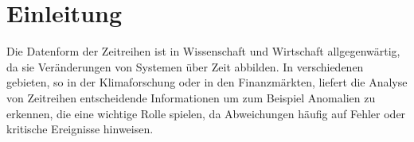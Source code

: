 \chapter{Einleitung}\label{ch:einleitung}
Die Datenform der Zeitreihen ist in Wissenschaft und Wirtschaft allgegenwärtig, da sie Veränderungen von Systemen über Zeit abbilden. In verschiedenen gebieten, so in der Klimaforschung oder in den Finanzmärkten, liefert die Analyse von Zeitreihen entscheidende Informationen um zum Beispiel Anomalien zu erkennen, die eine wichtige Rolle spielen, da Abweichungen häufig auf Fehler oder kritische Ereignisse hinweisen.


